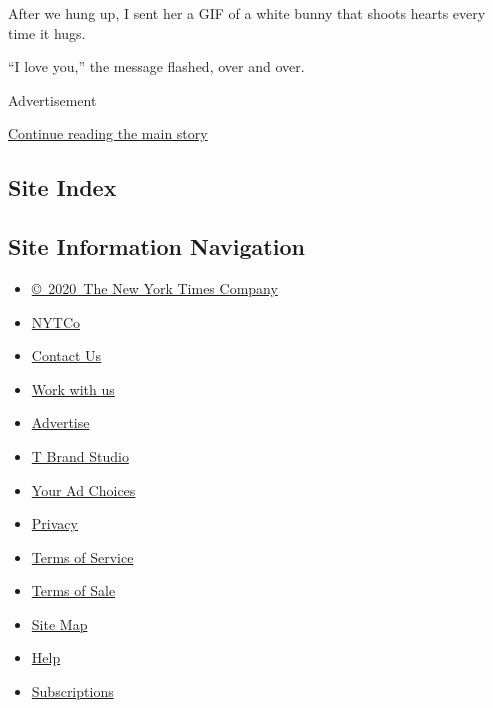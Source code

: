 After we hung up, I sent her a GIF of a white bunny that shoots hearts
every time it hugs.

``I love you,'' the message flashed, over and over.

Advertisement

\protect\hyperlink{after-bottom}{Continue reading the main story}

\hypertarget{site-index}{%
\subsection{Site Index}\label{site-index}}

\hypertarget{site-information-navigation}{%
\subsection{Site Information
Navigation}\label{site-information-navigation}}

\begin{itemize}
\tightlist
\item
  \href{https://help.nytimes.com/hc/en-us/articles/115014792127-Copyright-notice}{©~2020~The
  New York Times Company}
\end{itemize}

\begin{itemize}
\tightlist
\item
  \href{https://www.nytco.com/}{NYTCo}
\item
  \href{https://help.nytimes.com/hc/en-us/articles/115015385887-Contact-Us}{Contact
  Us}
\item
  \href{https://www.nytco.com/careers/}{Work with us}
\item
  \href{https://nytmediakit.com/}{Advertise}
\item
  \href{http://www.tbrandstudio.com/}{T Brand Studio}
\item
  \href{https://www.nytimes.com/privacy/cookie-policy\#how-do-i-manage-trackers}{Your
  Ad Choices}
\item
  \href{https://www.nytimes.com/privacy}{Privacy}
\item
  \href{https://help.nytimes.com/hc/en-us/articles/115014893428-Terms-of-service}{Terms
  of Service}
\item
  \href{https://help.nytimes.com/hc/en-us/articles/115014893968-Terms-of-sale}{Terms
  of Sale}
\item
  \href{https://spiderbites.nytimes.com}{Site Map}
\item
  \href{https://help.nytimes.com/hc/en-us}{Help}
\item
  \href{https://www.nytimes.com/subscription?campaignId=37WXW}{Subscriptions}
\end{itemize}
